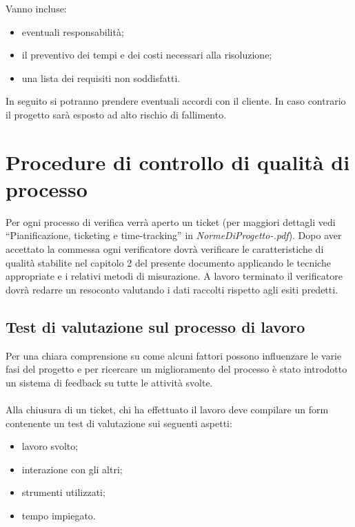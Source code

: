 Vanno incluse:

\begin{itemize}

\item eventuali responsabilit\`a;
\item il preventivo dei tempi e dei costi necessari alla risoluzione;
\item una lista dei requisiti non soddisfatti.

\end{itemize}

In seguito si potranno prendere eventuali accordi con il cliente. In caso
contrario il progetto sar\`a esposto ad alto rischio di fallimento.

\section{Procedure di controllo di qualit\`a di processo}
Per ogni processo di verifica verr\`a aperto un ticket (per maggiori dettagli vedi
``Pianificazione, ticketing e time-tracking'' in \emph{NormeDiProgetto-\versionenormeprogetto.pdf}). Dopo aver
accettato la commessa ogni verificatore dovr\`a verificare le caratteristiche di
qualit\`a stabilite nel capitolo 2 del presente documento applicando le tecniche
appropriate e i relativi metodi di misurazione. A lavoro terminato il
verificatore dovr\`a redarre un resoconto valutando i dati raccolti rispetto agli
esiti predetti.

\subsection{Test di valutazione sul processo di lavoro}
Per una chiara comprensione su come alcuni fattori possono influenzare le varie
fasi del progetto e per ricercare un miglioramento del processo \`e
stato introdotto un sistema di feedback su tutte le attivit\`a svolte.\\ \\
Alla chiusura di un ticket, chi ha effettuato il lavoro deve compilare un form
contenente un test di valutazione sui seguenti aspetti:

\begin{itemize}
\item lavoro svolto;
\item interazione con gli altri;
\item strumenti utilizzati;
\item tempo impiegato.
\end{itemize}

